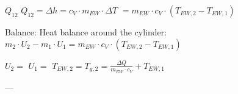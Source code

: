 \( Q_{12} \)  
\( Q_{12} = \Delta h = c_V \cdot m_{EW} \cdot \Delta T \)  
\( = m_{EW} \cdot c_V \cdot (T_{EW,2} - T_{EW,1}) \)  

Balance:  
Heat balance around the cylinder:  
\( m_2 \cdot U_2 - m_1 \cdot U_1 = m_{EW} \cdot c_V \cdot (T_{EW,2} - T_{EW,1}) \)  

\( U_2 = \)  
\( U_1 = \)  
\( T_{EW,2} = T_{g,2} = \frac{\Delta Q}{m_{EW} \cdot c_V} + T_{EW,1} \)  

---